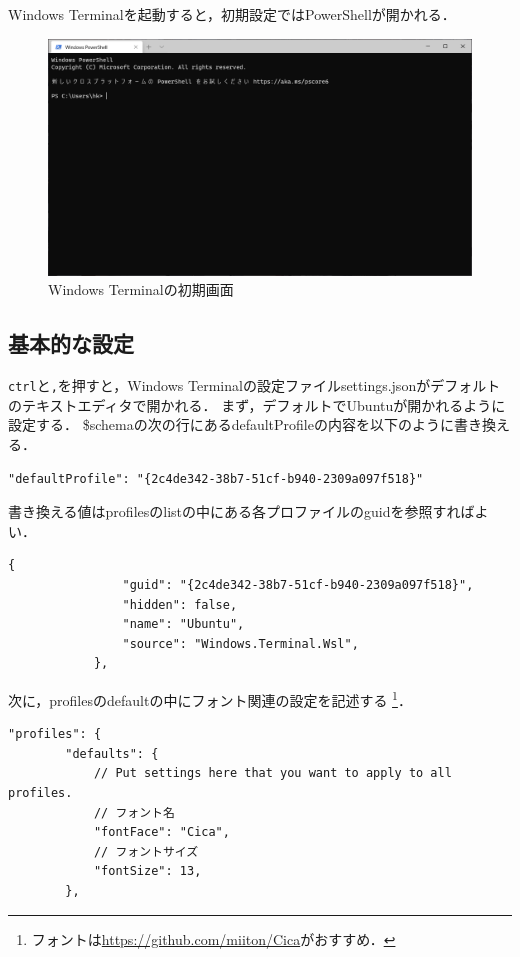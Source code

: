 \documentclass[uplatex]{jsarticle}
\begin{document}
Windows Terminalを起動すると，初期設定ではPowerShellが開かれる．

\begin{figure}[h]
\centering
\includegraphics[scale=0.4]{./図/startup_terminal.png}
\caption{Windows Terminalの初期画面}
\end{figure}

\newpage
\subsection{基本的な設定}
\verb|ctrl|と\verb|,|を押すと，Windows Terminalの設定ファイルsettings.jsonがデフォルトのテキストエディタで開かれる．
まず，デフォルトでUbuntuが開かれるように設定する．
\$schemaの次の行にあるdefaultProfileの内容を以下のように書き換える．
\vspace{5pt}
\begin{lstlisting}[style=code]
    "defaultProfile": "{2c4de342-38b7-51cf-b940-2309a097f518}"
\end{lstlisting}

書き換える値はprofilesのlistの中にある各プロファイルのguidを参照すればよい．
\vspace{5pt}
\begin{lstlisting}[style=code]
           {
                "guid": "{2c4de342-38b7-51cf-b940-2309a097f518}",
                "hidden": false,
                "name": "Ubuntu",
                "source": "Windows.Terminal.Wsl",
            },
\end{lstlisting}

次に，profilesのdefaultの中にフォント関連の設定を記述する
\footnote{フォントは\url{https://github.com/miiton/Cica}がおすすめ．}．
\vspace{5pt}
\begin{lstlisting}[style=code]
    "profiles": {
        "defaults": {
            // Put settings here that you want to apply to all profiles.
            // フォント名
            "fontFace": "Cica",
            // フォントサイズ
            "fontSize": 13,
        },
\end{lstlisting}
\end{document}
